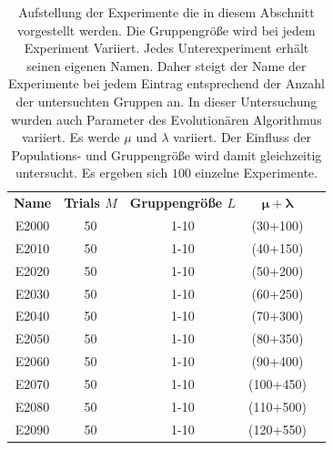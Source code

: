 %
\begin{table} [H]	
	\label{tab:experiments}
	\caption[Experimente - Ideale Messdaten]{Aufstellung der Experimente die in diesem Abschnitt vorgestellt werden. Die Gruppengröße wird bei jedem Experiment Variiert. Jedes Unterexperiment erhält seinen eigenen Namen. Daher steigt der Name der Experimente bei jedem Eintrag entsprechend der Anzahl der untersuchten Gruppen an. In dieser Untersuchung wurden auch Parameter des Evolutionären Algorithmus variiert. Es werde $\mu$ und $\lambda$ variiert. Der Einfluss der Populations- und Gruppengröße wird damit gleichzeitig untersucht. Es ergeben sich $100$ einzelne Experimente.}
	\begin{center}
		\begin{tabular}{ccccc}
			\textbf{Name} 	& \textbf{Trials $M$} 	& \textbf{Gruppengröße $L$} & \textbf{$\mathbf{\mu}+\mathbf{\lambda}$}\\
			E2000			& 50 				&    1-10		&  (30+100) \\
			E2010			& 50 				&    1-10		&  (40+150) \\
			E2020			& 50 				&    1-10		&  (50+200) \\
			E2030			& 50 				&    1-10		&  (60+250) \\
			E2040			& 50 				&    1-10		&  (70+300) \\			                        
			E2050			& 50 				&    1-10		&  (80+350) \\			                        
			E2060			& 50 				&    1-10		&  (90+400) \\			                        
			E2070			& 50 				&    1-10		&  (100+450) \\			                        
			E2080			& 50 				&    1-10		&  (110+500) \\			                        
			E2090			& 50 				&    1-10		&  (120+550) \\			                        
%			
		\end{tabular}
	\end{center}
\end{table}
%

